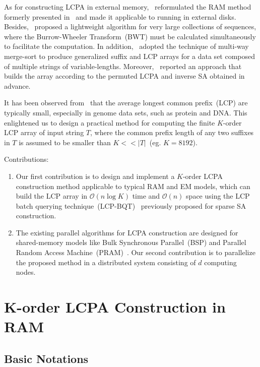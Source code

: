 \documentclass{llncs}
\begin{document}
As for constructing {LCPA} in external memory,~\cite{Bingmann-Code12} reformulated the {RAM} method formerly presented in~\cite{Fischer11} and made it applicable to running in external disks. Besides,~\cite{Markus2012} proposed a lightweight algorithm for very large collections of sequences, where the Burrow-Wheeler Transform~(BWT) must be calculated simultaneously to facilitate the computation. In addition,~\cite{Felipe2013} adopted the technique of multi-way merge-sort to produce generalized suffix and {LCP} arrays for a data set composed of multiple strings of variable-lengths. Moreover,~\cite{Juha2014} reported an approach that builds the array according to the permuted {LCPA} and inverse {SA} obtained in advance.

It has been observed from~\cite{Felipe2013} that the average longest common prefix~({LCP}) are typically small, especially in genome data sets, such as protein and {DNA}. This enlightened us to design a practical method for computing the finite $K$-order {LCP} array of input string $T$, where the common prefix length of any two suffixes in $T$ is assumed to be smaller than $K<<|T|$~(eg. $K=8192$).

Contributions:
\begin{enumerate}
\item Our first contribution is to design and implement a $K$-order {LCPA} construction method applicable to typical {RAM} and {EM} models, which can build the {LCP} array in $\mathcal{O}(n\log K)$ time and $\mathcal{O}(n)$ space using the {LCP} batch querying technique~({LCP-BQT})~\cite{Philip2013} previously proposed for sparse SA construction.
\item The existing parallel algorithms for {LCPA} construction are designed for shared-memory models like Bulk Synchronous Parallel~({BSP}) and Parallel Random Access Machine~({PRAM})~\cite{Shun2014,Deo2013}. Our second contribution is to parallelize the proposed method in a distributed system consisting of $d$ computing nodes.
\end{enumerate}

\section{K-order LCPA Construction in RAM}\label{sec:construction_in_ram}

\subsection{Basic Notations}\label{subsec:basic_notations}
\end{document}
